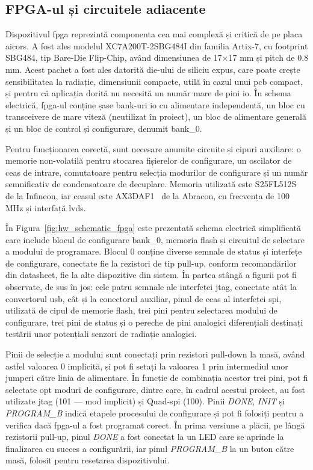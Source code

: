 \documentclass[12pt,a4paper]{report}
\begin{document}
\subsection{FPGA-ul și circuitele adiacente}
Dispozitivul \gls{fpga} reprezintă componenta cea mai complexă și critică de pe placa \gls{aicors}. A fost ales modelul XC7A200T-2SBG484I din familia Artix-7, cu footprint SBG484, tip Bare-Die Flip-Chip, având dimensiunea de 17\(\times\)17 mm și pitch de 0.8 mm. Acest pachet a fost ales datorită die-ului de siliciu expus, care poate crește sensibilitatea la radiație, dimensiunii compacte, utilă în cazul unui \gls{pcb} compact, și pentru că aplicația dorită nu necesită un număr mare de pini \gls{io}. În schema electrică, \gls{fpga}-ul conține șase bank-uri \gls{io} cu alimentare independentă, un bloc cu transceivere de mare viteză (neutilizat în proiect), un bloc de alimentare generală și un bloc de control și configurare, denumit bank\_0. 

Pentru funcționarea corectă, sunt necesare anumite circuite și cipuri auxiliare: o memorie non-volatilă pentru stocarea fișierelor de configurare, un oscilator de ceas de intrare, comutatoare pentru selecția modurilor de configurare și un număr semnificativ de condensatoare de decuplare. Memoria utilizată este S25FL512S~\cite{flash_datasheet} de la Infineon, iar ceasul este AX3DAF1~\cite{clock_datasheet} de la Abracon, cu frecvența de 100 MHz și interfață \gls{lvds}.

În Figura~\ref{fig:hw_schematic_fpga} este prezentată schema electrică simplificată care include blocul de configurare bank\_0, memoria flash și circuitul de selectare a modului de programare. Blocul 0 conține diverse semnale de status și interfețe de configurare, conectate fie la rezistori de tip pull-up, conform recomandărilor din datasheet, fie la alte dispozitive din sistem. În partea stângă a figurii pot fi observate, de sus în jos: cele patru semnale ale interfeței \gls{jtag}, conectate atât la convertorul \gls{usb}, cât și la conectorul auxiliar, pinul de ceas al interfeței \gls{spi}, utilizată de cipul de memorie flash, trei pini pentru selectarea modului de configurare, trei pini de status și o pereche de pini analogici diferențiali destinați testării unor potențiali senzori de radiație analogici.

Pinii de selecție a modului sunt conectați prin rezistori pull-down la masă, având astfel valoarea 0 implicită, și pot fi setați la valoarea 1 prin intermediul unor jumperi către linia de alimentare. În funcție de combinația acestor trei pini, pot fi selectate opt moduri de configurare, dintre care, în cadrul acestui proiect, au fost utilizate \gls{jtag} (101 --- mod implicit) și Quad-\gls{spi} (100). Pinii \textit{DONE}, \textit{INIT} și \textit{PROGRAM\_B} indică etapele procesului de configurare și pot fi folosiți pentru a verifica dacă \gls{fpga}-ul a fost programat corect. În prima versiune a plăcii, pe lângă rezistorii pull-up, pinul \textit{DONE} a fost conectat la un LED care se aprinde la finalizarea cu succes a configurării, iar pinul \textit{PROGRAM\_B} la un buton către masă, folosit pentru resetarea dispozitivului.
\end{document}
